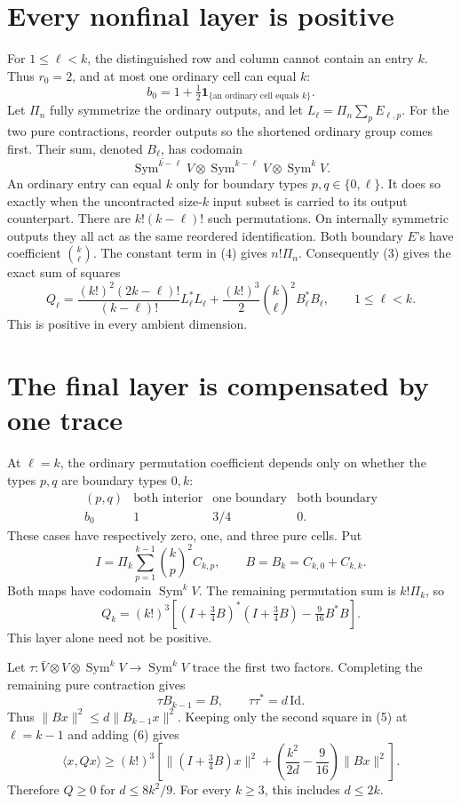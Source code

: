 \documentclass[11pt]{article}
\newcommand{\Sym}{\operatorname{Sym}}
\begin{document}
\section{Every nonfinal layer is positive}
For \(1\le\ell<k\), the distinguished row and column cannot contain an entry \(k\). Thus \(r_0=2\), and at most one ordinary cell can equal \(k\):
\[
 b_0=1+\tfrac12\mathbf1_{\{\text{an ordinary cell equals }k\}}.    \tag{4}
\]
Let \(\Pi_n\) fully symmetrize the ordinary outputs, and let
\(L_\ell=\Pi_n\sum_pE_{\ell,p}\).
For the two pure contractions, reorder outputs so the shortened ordinary group comes first. Their sum, denoted \(B_\ell\), has codomain
\[
 \overline{\Sym^{k-\ell}V}\otimes\Sym^{k-\ell}V\otimes\Sym^kV.
\]
An ordinary entry can equal \(k\) only for boundary types \(p,q\in\{0,\ell\}\). It does so exactly when the uncontracted size-\(k\) input subset is carried to its output counterpart. There are \(k!(k-\ell)!\) such permutations. On internally symmetric outputs they all act as the same reordered identification. Both boundary \(E\)'s have coefficient \(\binom{k}{\ell}\).
The constant term in (4) gives \(n!\Pi_n\). Consequently (3) gives the exact sum of squares
\[
 Q_\ell=\frac{(k!)^2(2k-\ell)!}{(k-\ell)!}L_\ell^*L_\ell
       +\frac{(k!)^3}{2}\binom{k}{\ell}^{\!2}B_\ell^*B_\ell,
       \qquad1\le\ell<k.                                    \tag{5}
\]
This is positive in every ambient dimension.

\section{The final layer is compensated by one trace}
At \(\ell=k\), the ordinary permutation coefficient depends only on whether the types \(p,q\) are boundary types \(0,k\):
\[
\begin{array}{c|ccc}
 (p,q)&\text{both interior}&\text{one boundary}&\text{both boundary}\\ \hline
 b_0&1&3/4&0 .
\end{array}
\]
These cases have respectively zero, one, and three pure cells. Put
\[
 I=\Pi_k\sum_{p=1}^{k-1}\binom{k}{p}^{\!2}C_{k,p},
 \qquad B=B_k=C_{k,0}+C_{k,k}.
\]
Both maps have codomain \(\Sym^kV\). The remaining permutation sum is \(k!\Pi_k\), so
\[
 Q_k=(k!)^3\left[
  (I+\tfrac34B)^*(I+\tfrac34B)-\tfrac9{16}B^*B\right].          \tag{6}
\]
This layer alone need not be positive.

Let \(\tau:\bar V\otimes V\otimes\Sym^kV\to\Sym^kV\) trace the first two factors. Completing the remaining pure contraction gives
\[
            \tau B_{k-1}=B,\qquad \tau\tau^*=d\,\mathrm{Id}.    \tag{7}
\]
Thus \(\|Bx\|^2\le d\|B_{k-1}x\|^2\). Keeping only the second square in (5) at \(\ell=k-1\) and adding (6) gives
\[
 \langle x,Qx\rangle\ge(k!)^3\left[
 \|(I+\tfrac34B)x\|^2+
 \left(\frac{k^2}{2d}-\frac9{16}\right)\|Bx\|^2\right].         \tag{8}
\]
Therefore \(Q\ge0\) for \(d\le8k^2/9\). For every \(k\ge3\), this includes \(d\le2k\).
\end{document}
